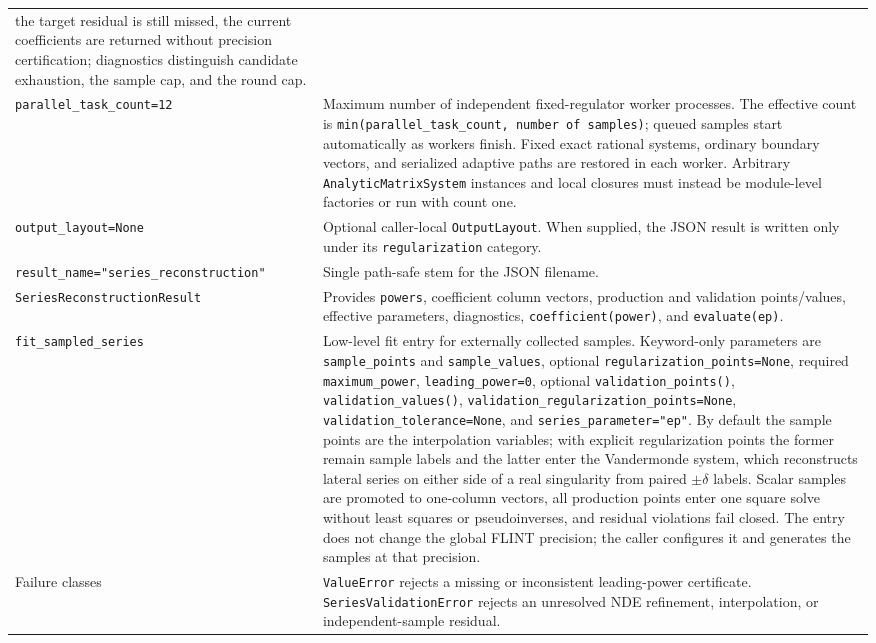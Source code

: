 \documentclass[11pt]{article}
\begin{document}
\begin{longtable}{L{0.36\textwidth}L{0.58\textwidth}}
the target residual is still missed, the current coefficients are returned without precision
certification; diagnostics distinguish candidate exhaustion, the sample cap, and the round cap. \\
\texttt{parallel\_task\_count=12} & Maximum number of independent fixed-regulator worker
processes.  The effective count is \texttt{min(parallel\_task\_count, number of samples)};
queued samples start automatically as workers finish.  Fixed exact rational systems, ordinary
boundary vectors, and serialized adaptive paths are restored in each worker.  Arbitrary
\texttt{AnalyticMatrixSystem} instances and local closures must instead be module-level
factories or run with count one. \\
\texttt{output\_layout=None} & Optional caller-local \texttt{OutputLayout}.  When supplied,
the JSON result is written only under its \texttt{regularization} category. \\
\texttt{result\_name=}\newline\texttt{"series\_reconstruction"} & Single path-safe stem for
the JSON filename. \\
\texttt{SeriesReconstructionResult} & Provides \texttt{powers}, coefficient column vectors,
production and validation points/values, effective parameters, diagnostics,
\texttt{coefficient(power)}, and \texttt{evaluate(ep)}. \\
\texttt{fit\_sampled\_series} & Low-level fit entry for externally collected samples.
Keyword-only parameters are \texttt{sample\_points} and \texttt{sample\_values}, optional
\texttt{regularization\_points=None}, required \texttt{maximum\_power},
\texttt{leading\_power=0}, optional \texttt{validation\_points()},
\texttt{validation\_values()}, \texttt{validation\_regularization\_points=None},
\texttt{validation\_tolerance=None}, and \texttt{series\_parameter="ep"}.  By default the
sample points are the interpolation variables; with explicit regularization points the
former remain sample labels and the latter enter the Vandermonde system, which reconstructs
lateral series on either side of a real singularity from paired $\pm\delta$ labels.  Scalar
samples are promoted to one-column vectors, all production points enter one square solve
without least squares or pseudoinverses, and residual violations fail closed.  The entry
does not change the global FLINT precision; the caller configures it and generates the
samples at that precision. \\
Failure classes & \texttt{ValueError} rejects a missing or inconsistent leading-power
certificate. \texttt{SeriesValidationError} rejects an unresolved NDE refinement,
interpolation, or independent-sample residual. \\
\bottomrule
\end{longtable}
\normalsize
\end{document}
